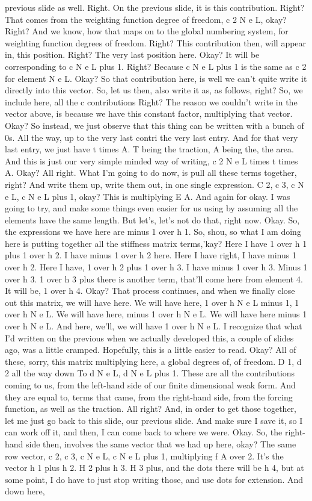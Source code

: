 \documentclass[10pt]{article}
\begin{document}
previous slide as well. Right. On the previous slide, it is this contribution. Right? That comes from the weighting function degree of freedom, c 2 N e L, okay? Right? And we know, how that maps on to the global numbering system, for weighting function degrees of freedom. Right? This contribution then, will appear in, this position. Right? The very last position here. Okay? It will be corresponding to c N e L plus 1. Right? Because c N e L plus 1 is the same as c 2 for element N e L. Okay? So that contribution here, is well we can't quite write it directly into this vector. So, let us then, also write it as, as follows, right? So, we include here, all the c contributions Right? The reason we couldn't write in the vector above, is because we have this constant factor, multiplying that vector. Okay? So instead, we just observe that this thing can be written with a bunch of 0s. All the way, up to the very last contri the very last entry. And for that very last entry, we just have t times A. T being the traction, A being the, the area. And this is just our very simple minded way of writing, c 2 N e L times t times A. Okay? All right. What I'm going to do now, is pull all these terms together, right? And write them up, write them out, in one single expression. C 2, c 3, c N e L, c N e L plus 1, okay? This is multiplying E A. And again for okay. I was going to try, and make some things even easier for us using by assuming all the elements have the same length. But let's, let's not do that, right now. Okay. So, the expressions we have here are minus 1 over h 1. So, shou, so what I am doing here is putting together all the stiffness matrix terms,'kay? Here I have 1 over h 1 plus 1 over h 2. I have minus 1 over h 2 here. Here I have right, I have minus 1 over h 2. Here I have, 1 over h 2 plus 1 over h 3. I have minus 1 over h 3. Minus 1 over h 3. 1 over h 3 plus there is another term, that'll come here from element 4. It will be, 1 over h 4. Okay? That process continues, and when we finally close out this matrix, we will have here. We will have here, 1 over h N e L minus 1, 1 over h N e L. We will have here, minus 1 over h N e L. We will have here minus 1 over h N e L. And here, we'll, we will have 1 over h N e L. I recognize that what I'd written on the previous  when we actually developed this, a couple of slides ago, was a little cramped. Hopefully, this is a little easier to read. Okay? All of these, sorry, this matrix multiplying here, a global degrees of, of freedom. D 1, d 2 all the way down To d N e L, d N e L plus 1. These are all the contributions coming to us, from the left-hand side of our finite dimensional weak form. And they are equal to, terms that came, from the right-hand side, from the forcing function, as well as the traction. All right? And, in order to get those together, let me just go back to this slide, our previous slide. And make sure I save it, so I can work off it, and then, I can come back to where we were. Okay. So, the right-hand side then, involves the same vector that we had up here, okay? The same row vector, c 2, c 3, c N e L, c N e L plus 1, multiplying f A over 2. It's the vector h 1 plus h 2. H 2 plus h 3. H 3 plus, and the dots there will be h 4, but at some point, I do have to just stop writing those, and use dots for extension. And down here, 
\end{document}
